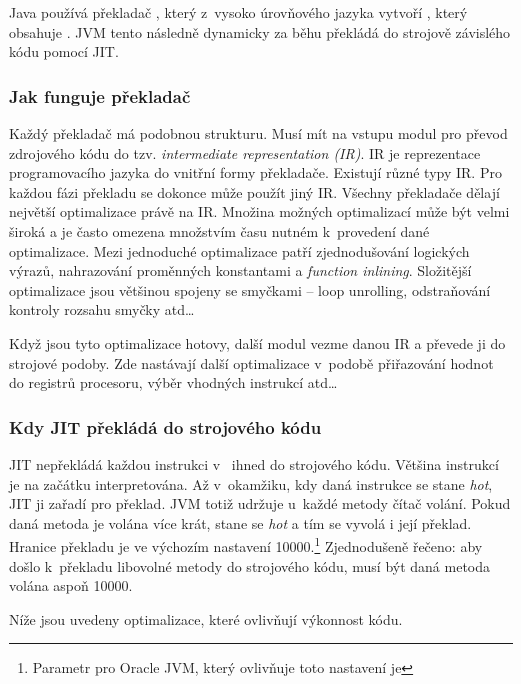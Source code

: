 Java používá překladač \javac{}, který z~vysoko úrovňového jazyka vytvoří \classfile{}, který obsahuje \bytecode{}. JVM tento \bytecode{} následně dynamicky za běhu překládá do strojově závislého kódu pomocí JIT.

\subsubsection{Jak funguje překladač}
Každý překladač má podobnou strukturu.
Musí mít na vstupu modul pro převod zdrojového kódu do tzv. \emph{intermediate representation (IR)}.
IR je reprezentace programovacího jazyka do vnitřní formy překladače.
Existují různé typy IR. Pro každou fázi překladu se dokonce může použít jiný IR.
Všechny překladače dělají největší optimalizace právě na IR.
Množina možných optimalizací může být velmi široká a je často omezena množstvím času nutném k~provedení dané optimalizace.
Mezi jednoduché optimalizace patří zjednodušování logických výrazů, nahrazování proměnných konstantami a \emph{function inlining}.
Složitější optimalizace jsou většinou spojeny se smyčkami -- loop unrolling, odstraňování kontroly rozsahu smyčky atd\ldots{}

Když jsou tyto optimalizace hotovy, další modul vezme danou IR a převede ji do strojové podoby. Zde nastávají další optimalizace v~podobě přiřazování hodnot do registrů procesoru, výběr vhodných instrukcí atd\ldots{}

\subsubsection{Kdy JIT překládá do strojového kódu\label{subsub:whenJIT}}
JIT nepřekládá každou instrukci v~\bytecode{} ihned do strojového kódu. Většina instrukcí je na začátku interpretována. Až v~okamžiku, kdy daná instrukce se stane \emph{hot}, JIT ji zařadí pro překlad. JVM totiž udržuje u~každé metody čítač volání. Pokud daná metoda je volána více krát, stane se \emph{hot} a tím se vyvolá i její překlad. Hranice překladu je ve výchozím nastavení 10000.\footnote{Parametr pro Oracle JVM, který ovlivňuje toto nastavení je } Zjednodušeně řečeno: aby došlo k~překladu libovolné metody do strojového kódu, musí být daná metoda volána aspoň 10000.

Níže jsou uvedeny optimalizace, které ovlivňují výkonnost kódu.

